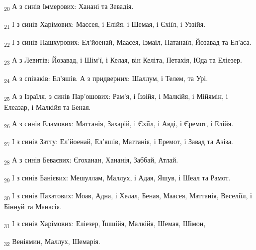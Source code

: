\begin{tcolorbox}
\textsubscript{20} А з синів Іммерових: Ханані та Зевадія.
\end{tcolorbox}
\begin{tcolorbox}
\textsubscript{21} І з синів Харімових: Массея, і Елійя, і Шемая, і Єхіїл, і Уззійя.
\end{tcolorbox}
\begin{tcolorbox}
\textsubscript{22} І з синів Пашхурових: Ел'йоенай, Маасея, Ізмаїл, Натанаїл, Йозавад та Ел'аса.
\end{tcolorbox}
\begin{tcolorbox}
\textsubscript{23} А з Левитів: Йозавад, і Шім'ї, і Келая, він Келіта, Петахія, Юда та Еліезер.
\end{tcolorbox}
\begin{tcolorbox}
\textsubscript{24} А з співаків: Ел'яшів. А з придверних: Шаллум, і Телем, та Урі.
\end{tcolorbox}
\begin{tcolorbox}
\textsubscript{25} А з Ізраїля, з синів Пар'ошових: Рам'я, і Їззійя, і Малкійя, і Мійямін, і Елеазар, і Малкійя та Беная.
\end{tcolorbox}
\begin{tcolorbox}
\textsubscript{26} А з синів Еламових: Маттанія, Захарій, і Єхіїл, і Авді, і Єремот, і Елійя.
\end{tcolorbox}
\begin{tcolorbox}
\textsubscript{27} І з синів Затту: Ел'йоенай, Ел'яшів, Маттанія, і Еремот, і Завад та Азіза.
\end{tcolorbox}
\begin{tcolorbox}
\textsubscript{28} А з синів Беваєвих: Єгоханан, Хананія, Заббай, Атлай.
\end{tcolorbox}
\begin{tcolorbox}
\textsubscript{29} І з синів Банієвих: Мешуллам, Маллух, і Адая, Яшув, і Шеал та Рамот.
\end{tcolorbox}
\begin{tcolorbox}
\textsubscript{30} І з синів Пахатових: Моав, Адна, і Хелал, Беная, Маасея, Маттанія, Веселіїл, і Біннуй та Манасія.
\end{tcolorbox}
\begin{tcolorbox}
\textsubscript{31} І з синів Харімових: Еліезер, Їшшійя, Малкійя, Шемая, Шімон,
\end{tcolorbox}
\begin{tcolorbox}
\textsubscript{32} Веніямин, Маллух, Шемарія.
\end{tcolorbox}
